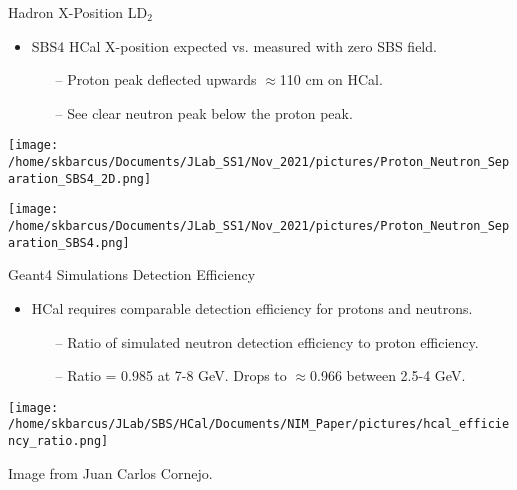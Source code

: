 \documentclass[10pt]{beamer}
\begin{document}
\begin{frame}{Hadron X-Position LD$_2$}

	\begin{itemize}
		\item SBS4 HCal X-position expected vs. measured with zero SBS field.
			\begin{itemize}
				\item[--] Proton peak deflected upwards $\approx$110 cm on HCal.
				\item[--] See clear neutron peak below the proton peak.
			\end{itemize}
	\end{itemize}

	\begin{overprint}
  		\centerline{\texttt{[image: /home/skbarcus/Documents/JLab\_SS1/Nov\_2021/pictures/Proton\_Neutron\_Separation\_SBS4\_2D.png]}}

  		\centerline{\texttt{[image: /home/skbarcus/Documents/JLab\_SS1/Nov\_2021/pictures/Proton\_Neutron\_Separation\_SBS4.png]}}
	
	\end{overprint}

\end{frame}

\begin{frame}{Geant4 Simulations Detection Efficiency}

	\begin{itemize}
		\item \alert{HCal requires comparable detection efficiency for protons and neutrons.} 
			\begin{itemize}
				\item[--] Ratio of simulated neutron detection efficiency to proton efficiency. 
				\item[--] Ratio = 0.985 at 7-8 GeV. Drops to $\approx$0.966 between 2.5-4 GeV.
			\end{itemize}
	\end{itemize}
	
	\vspace{-5mm}
	\begin{center}
  		\texttt{[image: /home/skbarcus/JLab/SBS/HCal/Documents/NIM\_Paper/pictures/hcal\_efficiency\_ratio.png]}
  	\end{center}
  	\vspace{-4mm}
  	\tiny{Image from Juan Carlos Cornejo.}

\end{frame}
\end{document}
